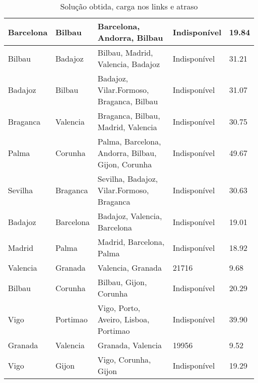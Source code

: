 \begin{table}[!htb]
{\begin{tabular}{|l|l|l|l|l|}
Barcelona & Bilbau & Barcelona, Andorra, Bilbau & Indisponível & 19.84 \\ \hline
Bilbau & Badajoz & Bilbau, Madrid, Valencia, Badajoz & Indisponível & 31.21 \\ \hline
Badajoz & Bilbau & Badajoz, Vilar.Formoso, Braganca, Bilbau & Indisponível & 31.07 \\ \hline
Braganca & Valencia & Braganca, Bilbau, Madrid, Valencia & Indisponível & 30.75 \\ \hline
Palma & Corunha & Palma, Barcelona, Andorra, Bilbau, Gijon, Corunha & Indisponível & 49.67 \\ \hline
Sevilha & Braganca & Sevilha, Badajoz, Vilar.Formoso, Braganca & Indisponível & 30.63 \\ \hline
Badajoz & Barcelona & Badajoz, Valencia, Barcelona & Indisponível & 19.01 \\ \hline
Madrid & Palma & Madrid, Barcelona, Palma & Indisponível & 18.92 \\ \hline
Valencia & Granada & Valencia, Granada & 21716 & 9.68 \\ \hline
Bilbau & Corunha & Bilbau, Gijon, Corunha & Indisponível & 20.29 \\ \hline
Vigo & Portimao & Vigo, Porto, Aveiro, Lisboa, Portimao & Indisponível & 39.90 \\ \hline
Granada & Valencia & Granada, Valencia & 19956 & 9.52 \\ \hline
Vigo & Gijon & Vigo, Corunha, Gijon & Indisponível & 19.29 \\ \hline
\end{tabular}}
\caption[]{Solução obtida, carga nos links e atraso}
\end{table}

